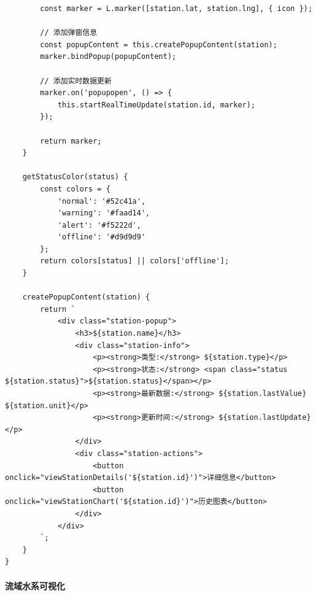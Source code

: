 \begin{lstlisting}
        const marker = L.marker([station.lat, station.lng], { icon });
        
        // 添加弹窗信息
        const popupContent = this.createPopupContent(station);
        marker.bindPopup(popupContent);
        
        // 添加实时数据更新
        marker.on('popupopen', () => {
            this.startRealTimeUpdate(station.id, marker);
        });
        
        return marker;
    }
    
    getStatusColor(status) {
        const colors = {
            'normal': '#52c41a',
            'warning': '#faad14', 
            'alert': '#f5222d',
            'offline': '#d9d9d9'
        };
        return colors[status] || colors['offline'];
    }
    
    createPopupContent(station) {
        return `
            <div class="station-popup">
                <h3>${station.name}</h3>
                <div class="station-info">
                    <p><strong>类型:</strong> ${station.type}</p>
                    <p><strong>状态:</strong> <span class="status ${station.status}">${station.status}</span></p>
                    <p><strong>最新数据:</strong> ${station.lastValue} ${station.unit}</p>
                    <p><strong>更新时间:</strong> ${station.lastUpdate}</p>
                </div>
                <div class="station-actions">
                    <button onclick="viewStationDetails('${station.id}')">详细信息</button>
                    <button onclick="viewStationChart('${station.id}')">历史图表</button>
                </div>
            </div>
        `;
    }
}
\end{lstlisting}

\paragraph{流域水系可视化}\label{ux6d41ux57dfux6c34ux7cfbux53efux89c6ux5316}

